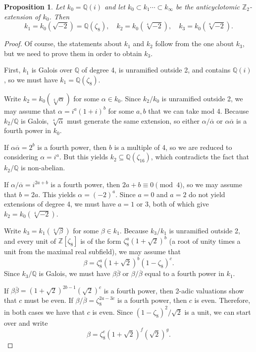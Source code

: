 \documentclass{amsart}
\newtheorem{proposition}[theorem]{Proposition}
\begin{document}
\begin{proposition} Let $k_0=\mathbb Q(i)$ and let $k_0\subset k_1 \cdots \subset k_{\infty}$
be the anticyclotomic $\mathbb Z_2$-extension of $k_0$. Then
$$
k_1=k_0(\sqrt{-2})=\mathbb Q(\zeta_8), \quad k_2= k_0(\sqrt[4]{-2}), \quad k_3 = k_0(\sqrt[8]{-2}).
$$
\end{proposition}
\begin{proof}
Of course, the statements about $k_1$ and $k_2$ follow from the one about $k_3$, but we need to prove them
in order to obtain $k_3$.

First, $k_1$ is Galois over $\mathbb Q$ of degree 4, is unramified outside 2, and contains $\mathbb Q(i)$, so we must have 
$k_1=\mathbb Q(\zeta_8)$.

Write $k_2=k_0(\sqrt[4]{\alpha})$ for some $\alpha\in k_0$. Since $k_2/k_0$ is unramified outside 2,
we may assume that $\alpha=i^a(1+i)^b$ for some $a, b$ that we can take mod 4. Because $k_2/\mathbb Q$ is Galois,
$\sqrt[4]{\overline{\alpha}}$ must generate the same extension, so either $\alpha/\overline{\alpha}$
or $\alpha\overline{\alpha}$ is a fourth power in $k_0$.

If $\alpha\overline{\alpha}=2^b$ is a fourth power, then $b$ is a multiple of 4, so we are reduced to considering
$\alpha=i^a$. But this yields $k_2\subseteq \mathbb Q(\zeta_{16})$, which contradicts the fact that $k_2/\mathbb Q$
is non-abelian.

If $\alpha/\overline{\alpha}= i^{2a+b}$ is a fourth power, then $2a+b\equiv 0\pmod 4$, so we may assume that
$b=2a$. This yields $\alpha = (-2)^a$. Since $a=0$ and $a=2$ do not yield extensions of degree 4,
we must have $a=1$ or $3$, both of which give $k_2=k_0(\sqrt[4]{-2})$.

Write $k_3=k_1(\sqrt[4]{\beta})$ for some $\beta\in k_1$. Because $k_3/k_1$ is unramified outside 2, and
every unit of $\mathbb Z[\zeta_8]$ is of the form $\zeta_8^a(1+\sqrt{2})^b$ (a root of unity times a unit 
from the maximal real subfield), we may assume that
$$
\beta=\zeta_8^a(1+\sqrt{2})^b(1-\zeta_8)^c.
$$
Since $k_3/\mathbb Q$ is Galois, we must have $\beta\overline{\beta}$ or $\beta/\overline{\beta}$ equal to
a fourth power in $k_1$. 

If $\beta\bar{\beta}= (1+\sqrt{2})^{2b-1}(\sqrt{2})^{c}$ is a fourth power, then 2-adic valuations show
that $c$ must be even. If $\beta/\overline{\beta}=\zeta_8^{2a-3c}$ is a fourth power, then $c$ is even.
Therefore, in both cases we have that $c$ is even. Since $(1-\zeta_8)^2/\sqrt{2}$ is a unit, we can start over
and write
$$
\beta=\zeta_8^e(1+\sqrt{2})^f (\sqrt{2})^g.
$$


\end{proof}
\end{document}
